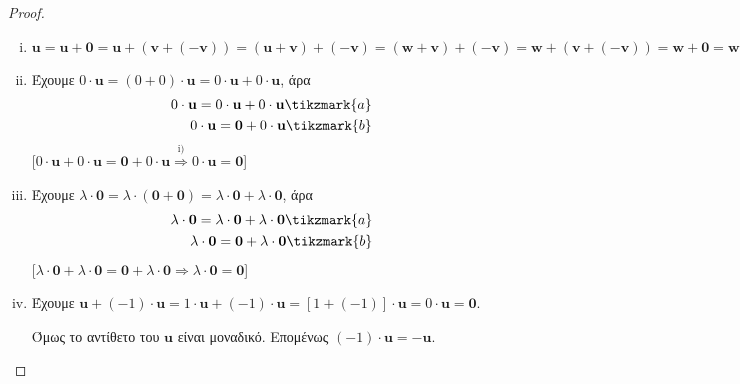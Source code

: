 \begin{proof}
\item {}
    \begin{enumerate}[i)]
        \item $ \mathbf{u} = \mathbf{u} + \mathbf{0} = \mathbf{u} + 
            (\mathbf{v} + (- \mathbf{v})) = (\mathbf{u} + \mathbf{v}) + (- \mathbf{v}) =
            (\mathbf{w} + \mathbf{v}) + (- \mathbf{v}) = \mathbf{w} + 
            (\mathbf{v} + (- \mathbf{v})) = \mathbf{w} + \mathbf{0} = \mathbf{w}$
        \item Έχουμε $ 0\cdot \mathbf{u} = (0 + 0) 
            \cdot \mathbf{u}= 0\cdot \mathbf{u}+ 0\cdot \mathbf{u} $, άρα
            \begin{align*}
                0\cdot \mathbf{u} = 0\cdot \mathbf{u} + 0\cdot
                \mathbf{u}\tikzmark{a} \\
                0\cdot \mathbf{u} = \mathbf{0} + 0\cdot \mathbf{u} 
                \tikzmark{b}
            \end{align*} 
            [$ 0\cdot \mathbf{u} + 0\cdot \mathbf{u} = 
            \mathbf{0}+ 0\cdot \mathbf{u} \overset{\text{i)}}{\Rightarrow}  
            0\cdot \mathbf{u} = \mathbf{0}$]
        \item Έχουμε $ \lambda \cdot \mathbf{0} = \lambda \cdot 
            (\mathbf{0} + \mathbf{0}) = \lambda \cdot \mathbf{0} + \lambda 
            \cdot \mathbf{0}$, άρα 
            \begin{align*}
                \lambda \cdot \mathbf{0} = \lambda \cdot \mathbf{0} + \lambda \cdot 
                \mathbf{0} \tikzmark{a} \\
                \lambda \cdot \mathbf{0} = \mathbf{0} + \lambda \cdot \mathbf{0}
                \tikzmark{b}
            \end{align*}
            [$ \lambda \cdot \mathbf{0}+ \lambda \cdot \mathbf{0} = 
            \mathbf{0} + \lambda \cdot \mathbf{0} \Rightarrow \lambda 
            \cdot \mathbf{0} = \mathbf{0}$]
        \item Έχουμε $ \mathbf{u} + (-1)\cdot \mathbf{u} = 1\cdot 
            \mathbf{u} + (-1)\cdot \mathbf{u} = [1+(-1)] \cdot \mathbf{u}= 0 
            \cdot \mathbf{u} = \mathbf{0} $. 

            Όμως το αντίθετο του $ \mathbf{u} $ είναι μοναδικό. Επομένως 
            $ (-1)\cdot \mathbf{u} = - \mathbf{u}$.


\end{enumerate}
\end{proof}
